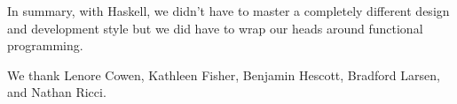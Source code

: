 \documentclass[preprint,nonatbib,blockstyle,nocopyrightspace,times]{sigplanconf}
\begin{document}
In summary, with Haskell, we didn't have to master a completely different 
design and development style but we did have to wrap our heads around 
functional programming.


%  
%  
%  

% 

\acks

We thank Lenore Cowen, Kathleen Fisher, Benjamin Hescott, Bradford Larsen, and Nathan Ricci.






\end{document}
